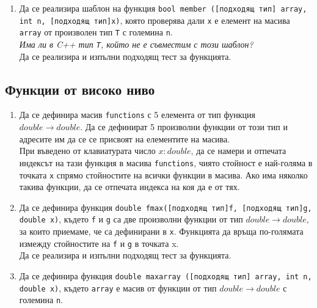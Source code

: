 {\begin{enumerate}
	\textit{Какви са допустимите типове \texttt{T} за този шаблон?}\\

	Да се реализира и изпълни подходящ тест за функцията.

	\item Да се реализира шаблон на функция \texttt{bool member ([подходящ тип] array, int n, [подходящ тип]x)}, която проверява дали \texttt{x} е елемент на масива \texttt{array} от произволен тип \texttt{T} с големина \texttt{n}.\\

	\textit{Има ли в C++ тип \texttt{T}, който не е съвместим с този шаблон?}\\

	Да се реализира и изпълни подходящ тест за функцията.

\end{enumerate}

\pagebreak
\subsection {Функции от високо ниво}

\begin{enumerate}[resume]  


	\item Да се дефинира масив \texttt{functions} с 5 елемента от тип функция $double \rightarrow double$. Да се дефинират 5 произволни функции от този тип и адресите им да се се присвоят на елементите на масива.\\

	При въведено от клавиатурата число $x:double$, да се намери и отпечата индексът на тази функция в масива \texttt{functions}, чиято стойност е най-голяма в точката \texttt{x} спрямо стойностите на всички функции в масива. Ако има няколко такива функции, да се отпечата индекса на коя да е от тях.

	\item Да се дефинира функция \texttt{double fmax([подходящ тип]f, [подходящ тип]g, double x)}, където \texttt{f} и \texttt{g} са две произволни функции от тип $double \rightarrow double$, за които приемаме, че са дефинирани в \texttt{x}.  Функцията да връща по-голямата измежду стойностите на \texttt{f} и \texttt{g} в точката x.\\

	Да се реализира и изпълни подходящ тест за функцията.

	\item Да се дефинира функция \texttt{double maxarray ([подходящ тип] array, int n, double x)}, където \texttt{array} е масив от функции от тип $double \rightarrow double$ с големина \texttt{n}. \\


\end{enumerate}}

